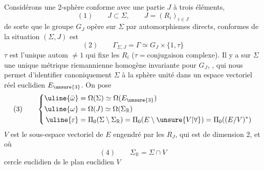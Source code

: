 Considérons une 2-sphère conforme \inserted{$\Sigma$} avec une partie $J$ à trois éléments,
\[
(1)\qquad J\subset\Sigma,\qquad J=(R_i)_{i\in J}
\]
de sorte que le groupe $G_J$ opère sur $\Sigma$ par automorphismes  directs,    conformes de la situation $(\Sigma,J)$ est
\[
(2)\qquad\Gamma_{\Sigma,J}=\Gamma\simeq G_J\times\{1,\tau\}
\]
$\tau$ est l'unique autom $\ne1$  qui fixe les $R_i$  ($\tau={}$conjugaison complexe).
Il y a sur $\Sigma$ une unique métrique riemannienne homogène invariante pour $G_J$,  , qui nous permet d'identifier canoniquement $\Sigma$ à la sphère unité dans un espace vectoriel réel euclidien $E_{\unsure{3}}$. On pose
\[
(3)\qquad\left\{\begin{aligned}
\uline{\bar\omega}&=\Omega(\Sigma)\simeq\Omega(E_{\unsure{3}})\\
\uline{\omega}&=\Omega(J)\simeq\Omega(\Sigma_{\mathbb R})\\
\uline{\varepsilon}&=\Pi_0(\Sigma\setminus\Sigma_{\mathbb R})=\Pi_0(E\setminus\unsure{V|\forall})=\Pi_0((E/V)^*)
\end{aligned}\right.
\]
$V$ est le sous-espace vectoriel de $E$ engendré par les $R_J$, qui est de dimension 2, et où
\[
(4)\qquad\Sigma_{\mathbb R}=\Sigma\cap V
\]
cercle euclidien ds le plan euclidien $V$
